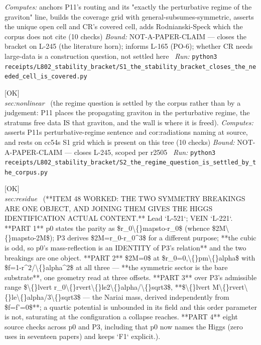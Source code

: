 \begin{description}
\emph{Computes:} anchors P11's routing and its "exactly the perturbative regime of the graviton" line, builds the coverage grid with general-subsumes-symmetric, asserts the unique open cell and CR's covered cell, adds Rodnianski-Speck which the corpus does not cite (10 checks)
 \emph{Bound:} NOT-A-PAPER-CLAIM --- closes the bracket on L-245 (the literature horn); informs L-165 (PO-6); whether CR needs large-data is a construction question, not settled here
\ \emph{Run:} \texttt{python3 receipts/L802\_stability\_bracket/S1\_the\_stability\_bracket\_closes\_the\_needed\_cell\_is\_covered.py}
\item[\label{rcpt:S2_the_regime_question_is_settled_by_the_corpus}\texttt{S2\_the\_regime\_question\_is\_settled\_by\_the\_corpus}]\hfill\textsf{[OK]}\\
\textit{sec:nonlinear} \ (the regime question is settled by the corpus rather than by a judgement: P11 places the propagating graviton in the perturbative regime, the stratums free data IS that graviton, and the wall is where it is freed). 
\emph{Computes:} asserts P11s perturbative-regime sentence and cor:radiations naming at source, and rests on cc54s S1 grid which is present on this tree (10 checks)
 \emph{Bound:} NOT-A-PAPER-CLAIM --- closes L-245, scoped per r2505
\ \emph{Run:} \texttt{python3 receipts/L802\_stability\_bracket/S2\_the\_regime\_question\_is\_settled\_by\_the\_corpus.py}
\item[\label{rcpt:P0_the_order_parameter_is_the_offset_and_it_is_bounded_by_the_nariai_member}\texttt{P0\_the\_order\_parameter\_is\_the\_offset\_and\_it\_is\_bounded\_by\_the\_nariai\_member}]\hfill\textsf{[OK]}\\
\textit{sec:residue} \ (**ITEM 48 WORKED: THE TWO SYMMETRY BREAKINGS ARE ONE OBJECT, AND JOINING THEM GIVES THE HIGGS IDENTIFICATION ACTUAL CONTENT.** Lead `L-521`; VEIN `L-221`. **PART 1** p0 states the parity as \$r\_0\textbackslash\{\}mapsto-r\_0\$ (whence \$2M\textbackslash\{\}mapsto-2M\$); P3 derives \$2M=r\_0-r\_0\textasciicircum{}3\$ for a different purpose; **the cubic is odd, so p0's mass-reflection is an IDENTITY of P3's relation** and the two breakings are one object. **PART 2** \$2M=0\$ at \$r\_0=0,\textbackslash\{\}pm\textbackslash\{\}alpha\$ with \$f=1-r\textasciicircum{}2/\textbackslash\{\}alpha\textasciicircum{}2\$ at all three --- **the symmetric sector is the bare substrate**, one geometry read at three offsets. **PART 3** over P3's admissible range \$\textbackslash\{\}lvert r\_0\textbackslash\{\}rvert\textbackslash\{\}le2\textbackslash\{\}alpha/\textbackslash\{\}sqrt3\$, **\$\textbackslash\{\}lvert M\textbackslash\{\}rvert\textbackslash\{\}le\textbackslash\{\}alpha/3\textbackslash\{\}sqrt3\$ --- the Nariai mass, derived independently from \$f=f'=0\$**; a quartic potential is unbounded in its field and this order parameter is not, saturating at the configuration a collapse reaches. **PART 4** eight source checks across p0 and P3, including that p0 now names the Higgs (zero uses in seventeen papers) and keeps `F1` explicit.). 

\end{description}
